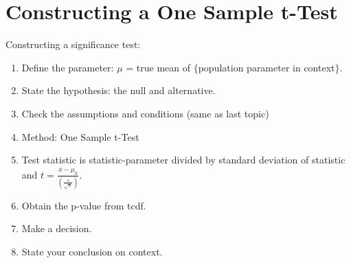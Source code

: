 \documentclass[../stats.tex]{subfiles}
\begin{document}
\section{Constructing a One Sample t-Test}
Constructing a significance test:
\begin{enumerate}
    \item Define the parameter: $\mu$ = true mean of $\{$population parameter in context$\}$.
    \item State the hypothesis: the null and alternative.
    \item Check the assumptions and conditions (same as last topic)
    \item Method: One Sample t-Test
    \item Test statistic is statistic-parameter divided by standard deviation of statistic and $t=\frac{\overline{x}-\mu_0}{\left(\frac{s}{\sqrt{n}}\right)}$.
    \item Obtain the p-value from tcdf.
    \item Make a decision.
    \item State your conclusion on context.
\end{enumerate}
\end{document}
